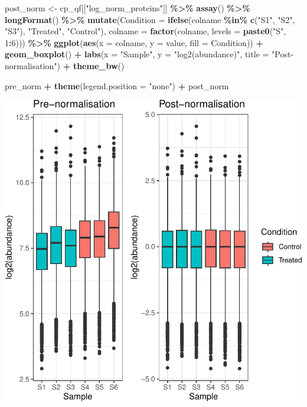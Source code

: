 \documentclass[9pt,a4paper,]{extarticle}
\newenvironment{Shaded}{\begin{snugshade}}{\end{snugshade}}
\newcommand{\AttributeTok}[1]{\textcolor[rgb]{0.13,0.29,0.53}{#1}}
\newcommand{\DecValTok}[1]{\textcolor[rgb]{0.00,0.00,0.81}{#1}}
\newcommand{\FunctionTok}[1]{\textcolor[rgb]{0.13,0.29,0.53}{\textbf{#1}}}
\newcommand{\NormalTok}[1]{#1}
\newcommand{\OtherTok}[1]{\textcolor[rgb]{0.56,0.35,0.01}{#1}}
\newcommand{\SpecialCharTok}[1]{\textcolor[rgb]{0.81,0.36,0.00}{\textbf{#1}}}
\newcommand{\StringTok}[1]{\textcolor[rgb]{0.31,0.60,0.02}{#1}}
\begin{document}
\begin{Shaded}
\begin{Highlighting}[]
\NormalTok{post\_norm }\OtherTok{\textless{}{-}}\NormalTok{ cp\_qf[[}\StringTok{"log\_norm\_proteins"}\NormalTok{]] }\SpecialCharTok{\%\textgreater{}\%}
  \FunctionTok{assay}\NormalTok{() }\SpecialCharTok{\%\textgreater{}\%}
  \FunctionTok{longFormat}\NormalTok{() }\SpecialCharTok{\%\textgreater{}\%}
  \FunctionTok{mutate}\NormalTok{(}\AttributeTok{Condition =} \FunctionTok{ifelse}\NormalTok{(colname }\SpecialCharTok{\%in\%} \FunctionTok{c}\NormalTok{(}\StringTok{"S1"}\NormalTok{, }\StringTok{"S2"}\NormalTok{, }\StringTok{"S3"}\NormalTok{),}
                            \StringTok{"Treated"}\NormalTok{, }\StringTok{"Control"}\NormalTok{),}
         \AttributeTok{colname =} \FunctionTok{factor}\NormalTok{(colname, }\AttributeTok{levels =} \FunctionTok{paste0}\NormalTok{(}\StringTok{"S"}\NormalTok{, }\DecValTok{1}\SpecialCharTok{:}\DecValTok{6}\NormalTok{))) }\SpecialCharTok{\%\textgreater{}\%}
  \FunctionTok{ggplot}\NormalTok{(}\FunctionTok{aes}\NormalTok{(}\AttributeTok{x =}\NormalTok{ colname, }\AttributeTok{y =}\NormalTok{ value, }\AttributeTok{fill =}\NormalTok{ Condition)) }\SpecialCharTok{+}
  \FunctionTok{geom\_boxplot}\NormalTok{() }\SpecialCharTok{+}
  \FunctionTok{labs}\NormalTok{(}\AttributeTok{x =} \StringTok{"Sample"}\NormalTok{, }\AttributeTok{y =} \StringTok{"log2(abundance)"}\NormalTok{, }\AttributeTok{title =} \StringTok{"Post{-}normalisation"}\NormalTok{) }\SpecialCharTok{+}
  \FunctionTok{theme\_bw}\NormalTok{()}

\NormalTok{pre\_norm }\SpecialCharTok{+} \FunctionTok{theme}\NormalTok{(}\AttributeTok{legend.position =} \StringTok{"none"}\NormalTok{) }\SpecialCharTok{+}\NormalTok{ post\_norm}
\end{Highlighting}
\end{Shaded}

\begin{center}\includegraphics[height=0.4\textheight]{workflow_expressions_files/figure-latex/tmt_normalisation_2-1} \end{center}
\end{document}
